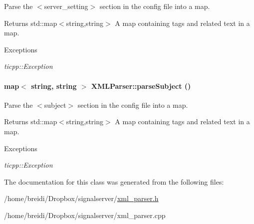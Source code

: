 Parse the $<$server\_\-setting$>$ section in the config file into a map. \begin{DoxyReturn}{Returns}
std::map$<$string,string$>$ A map containing tags and related text in a map. 
\end{DoxyReturn}

\begin{DoxyExceptions}{Exceptions}
\item[{\em ticpp::Exception}]\end{DoxyExceptions}
\hypertarget{class_x_m_l_parser_a39c0441d925941cdbda86f14b01c659b}{
\paragraph[{parseSubject}]{\setlength{\rightskip}{0pt plus 5cm}map$<$ string, string $>$ XMLParser::parseSubject ()}\hfill}
\label{class_x_m_l_parser_a39c0441d925941cdbda86f14b01c659b}


Parse the $<$subject$>$ section in the config file into a map. \begin{DoxyReturn}{Returns}
std::map$<$string,string$>$ A map containing tags and related text in a map. 
\end{DoxyReturn}

\begin{DoxyExceptions}{Exceptions}
\item[{\em ticpp::Exception}]\end{DoxyExceptions}


The documentation for this class was generated from the following files:\begin{DoxyCompactItemize}
\item 
/home/breidi/Dropbox/signalserver/\hyperlink{xml__parser_8h}{xml\_\-parser.h}\item 
/home/breidi/Dropbox/signalserver/xml\_\-parser.cpp\end{DoxyCompactItemize}
